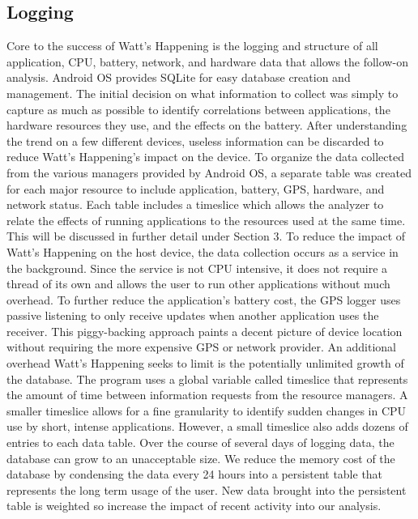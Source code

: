 \documentclass[11pt,twocolumn]{article}
\begin{document}
\subsection*{Logging}
Core to the success of Watt's Happening is the logging and structure of all application, CPU, battery, network, and hardware data that allows the follow-on analysis.  
Android OS provides SQLite for easy database creation and management. 
The initial decision on what information to collect was simply to capture as much as possible to identify correlations between applications, the hardware resources they use, and the effects on the battery.  
After understanding the trend on a few different devices, useless information can be discarded to reduce Watt's Happening's impact on the device.
To organize the data collected from the various managers provided by Android OS, a separate table was created for each major resource to include application, battery, GPS, hardware, and network status.  
Each table includes a timeslice which allows the analyzer to relate the effects of running applications to the resources used at the same time.  
This will be discussed in further detail under Section 3.
To reduce the impact of Watt's Happening on the host device, the data collection occurs as a service in the background.  
Since the service is not CPU intensive, it does not require a thread of its own and allows 
the user to run other applications without much overhead.  
To further reduce the application's battery cost, the GPS logger uses passive listening to only receive updates when another application uses the receiver.  
This piggy-backing approach paints a decent picture of device location without requiring the more expensive GPS or network provider.
An additional overhead Watt's Happening seeks to limit is the potentially unlimited growth of the database.  
The program uses a global variable called timeslice that represents the amount of time between information requests from the resource managers.  
A smaller timeslice allows for a fine granularity to identify sudden changes in CPU use by short, intense applications.  
However, a small timeslice also adds dozens of entries to each data table. 
 Over the course of several days of logging data, the database can grow to an unacceptable size.  
We reduce the memory cost of the database by condensing the data every 24 hours into a persistent table that represents the long term usage of the user.  
New data brought into the persistent table is weighted so increase the impact of recent activity into our analysis.
\end{document}
